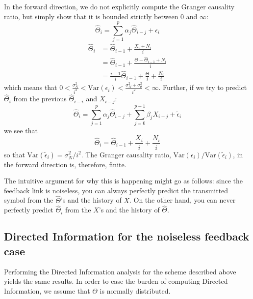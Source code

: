 \documentclass[letterpaper, 10pt, conference]{ieeeconf}
\begin{document}
In the forward direction, we do not explicitly compute the Granger causality ratio, but simply show that it is bounded strictly between 0 and $\infty$:
\begin{equation*}
	\widehat\Theta_i = \sum_{j=1}^p{\alpha_j \widehat\Theta_{i-j}} + \epsilon_i
\end{equation*}
\begin{align*}
	\widehat\Theta_i &= \widehat\Theta_{i-1} + \frac{X_i + N_i}{i} \\
					 &= \widehat\Theta_{i-1} + \frac{\Theta - \widehat\Theta_{i-1} + N_i}{i} \\
					 &= \frac{i-1}{i} \widehat\Theta_{i-1} + \frac{\Theta}{i} + \frac{N_i}{i}
\end{align*}
which means that $0 < \frac{\sigma_N^2}{i^2} < \text{Var}(\epsilon_i) < \frac{\sigma_N^2 + \sigma_\theta^2}{i^2} < \infty$.
Further, if we try to predict $\widehat\Theta_i$ from the previous $\widehat\Theta_{i-i}$ and $X_{i-j}$:
\begin{equation*}
	\widehat\Theta_i = \sum_{j=1}^{p}{\alpha_j \widehat\Theta_{i-j}} + \sum_{j=0}^{p-1}{\beta_j X_{i-j}} + \tilde\epsilon_i
\end{equation*}
we see that
\begin{equation*}
	\widehat\Theta_i = \widehat\Theta_{i-1} + \frac{X_i}{i} + \frac{N_i}{i}
\end{equation*}
so that $\text{Var}(\tilde\epsilon_i) = \sigma_N^2/i^2$. The Granger causality ratio, $\text{Var}(\epsilon_i) / \text{Var}(\tilde\epsilon_i)$, in the forward direction is, therefore, finite.

The intuitive argument for why this is happening might go as follows: since the feedback link is noiseless, you can always perfectly predict the transmitted symbol from the $\widehat\Theta$'s and the history of $X$. On the other hand, you can never perfectly predict $\widehat\Theta_i$ from the $X$'s and the history of $\widehat\Theta$.


\subsection{Directed Information for the noiseless feedback case}
\label{sec:dir-info-noiseless}

Performing the Directed Information analysis for the scheme described above yields the same results. In order to ease the burden of computing Directed Information, we assume that $\Theta$ is normally distributed.
\end{document}
